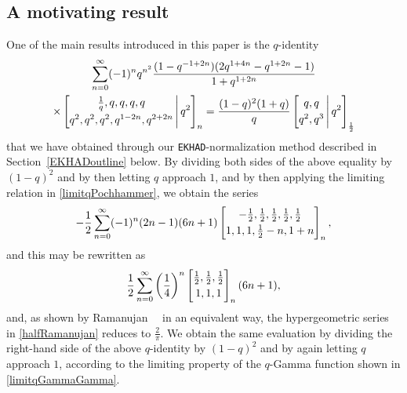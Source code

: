\documentclass[12pt]{article}
\begin{document}
\subsection{A motivating result}\label{subsectionmotivating}
 One of the main results introduced in this paper is the $q$-identity 
\begin{multline*}
 \sum_{n=0}^{\infty} (-1)^n 
 q^{n^2} \frac{ (1-q^{ -1 + 2n}) (2 q^{1+4n} - q^{1+2n} - 1 ) }{1 + q^{1+2n}} \\ 
 \times \left[ \begin{matrix} \frac{1}{q}, q, q, q, q \vspace{1mm} \\ 
 q^2, q^2, q^2, q^{1-2n}, q^{2+2n} \end{matrix} \, \Bigg| \, q^2 \right]_{n}
 = 
 \frac{(1-q)^2 (1+q)}{q} \left[ \begin{matrix} q, q \vspace{1mm} \\ 
 q^2, q^3 \end{matrix} \, \Bigg| \, q^2 \right]_{\frac{1}{2}}
\end{multline*}
 that we have obtained through our {\tt EKHAD}-normalization method described in Section~\ref{EKHADoutline} below. 
 By dividing both sides of the above equality 
 by $(1-q)^2$ and by then letting $q$ approach $1$, 
 and by then applying the limiting relation in \eqref{limitqPochhammer}, 
 we obtain the series 
 $$ -\frac{1}{2} \sum_{n=0}^{\infty} (-1)^{n} (2 n-1) (6 n+1)
 \left[ \begin{matrix} -\frac{1}{2}, \frac{1}{2}, \frac{1}{2}, \frac{1}{2}, \frac{1}{2}
 \vspace{1mm} \\ 
 1, 1, 1, \frac{1}{2} - n, 1 + n \end{matrix} \right]_{n}, $$
 and this may be rewritten as 
\begin{equation}\label{halfRamanujan}
 \frac{1}{2} \sum_{n=0}^{\infty} \left( \frac{1}{4} \right)^{n} 
 \left[ \begin{matrix} \frac{1}{2}, \frac{1}{2}, \frac{1}{2}
 \vspace{1mm} \\ 
 1, 1, 1 \end{matrix} \right]_{n} (6n+1), 
\end{equation}
 and, as shown by Ramanujan~\cite[pp.\ 352--354]{Berndt1994PartIV}~\cite{Ramanujan1914} in an equivalent way, 
 the hypergeometric series in \eqref{halfRamanujan}
 reduces to $\frac{2}{\pi}$. We obtain the same evaluation by dividing
 the right-hand side of the above $q$-identity by $(1-q)^2$
 and by again letting $q$ approach $1$, 
 according to the limiting property of the $q$-Gamma function shown in \eqref{limitqGammaGamma}. 
\end{document}
